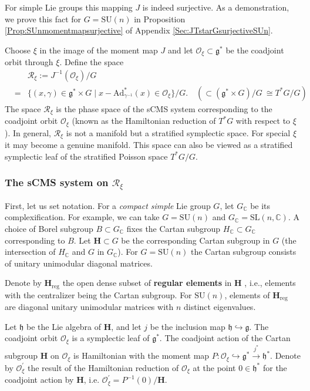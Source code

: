 \documentclass[12pt]{amsart}
\theoremstyle{definition}
\numberwithin{equation}{section}
\newcommand{\SU}{\mathrm{SU}}
\newcommand{\CC}{\mathbb{C}}
\newcommand{\gstar}{\mathfrak{g}^*}
\newcommand{\Oxi}{\mathcal{O}_{\xi}}
\newcommand{\Reducedxi}{\mathcal{R}_\xi}
\newcommand{\Adjointaction}{\mathrm{Ad}}
\newcommand{\Lieg}{\mathfrak{g}}
\newcommand{\Hreg}{\Cartan_{\mathrm{reg}}}
\newcommand{\Cartan}{\mathbf{H}}
\newcommand{\cartan}{\mathfrak{h}}
\newcommand{\Oprimexi}{\mathcal{O}^{\prime}_{\xi}}
\begin{document}
For simple Lie groups this mapping $J$ is indeed surjective. As a demonstration, we prove this fact for $G=\SU(n)$ in 
Proposition \ref{Prop:SUnmomentmapsurjective} of Appendix \ref{Sec:JTstarGsurjectiveSUn}.

Choose $\xi$ in the image of the moment map $J$ and let $\mathcal{O}_\xi\subset \gstar$ be the coadjoint orbit through $\xi$. Define the space 
\begin{eqnarray*}
		&& \Reducedxi :=	J^{-1}(\mathcal{O}_\xi)/G\\
		&=&\{(x,\gamma)\in \mathfrak{g}^*\times G \mid x-{\Adjointaction^*_{\gamma^{-1}}}(x)\in\mathcal{O}_\xi \}/G. \quad  (\subset(\mathfrak{g} ^*\times G) /G ~ \cong T^*G/G) 
\end{eqnarray*}
The space $\Reducedxi$ is the phase space of the sCMS system corresponding to the coadjoint orbit $\mathcal{O}_\xi$ 
 (known as the Hamiltonian reduction of $T^*G$ with respect to  $\xi$). In general, $\Reducedxi$ is not a manifold but a stratified symplectic space.  For special $\xi$  it  may become a genuine manifold. This space can also be viewed as a stratified symplectic leaf of the stratified Poisson space $T^*G/G$. 


\subsubsection{The sCMS system on $\Reducedxi$} 

First, let us set notation. For a \emph{compact simple} Lie group $G$, let $G_\CC$ be its complexification. For example, we can take $G=\SU(n)$ and $G_\CC=\mathrm{SL}(n,\CC)$. A choice of Borel subgroup $B\subset G_\CC$  fixes the Cartan subgroup $H_\CC\subset G_\CC$ corresponding to $B$. Let $\Cartan\subset G$ be the corresponding Cartan subgroup in $G$ (the intersection of $H_\CC$ and $G$ in $G_\CC$). For $G=\SU(n)$ the Cartan subgroup consists of unitary unimodular diagonal matrices. 

Denote by $\Hreg $ the open dense subset of \textbf{regular elements} in $\Cartan$ , i.e., elements with the centralizer being the Cartan subgroup. For $\SU(n)$, elements of $\Hreg $ are diagonal unitary unimodular matrices with $n$ distinct eigenvalues.
	
Let $\cartan$   be the Lie algebra of $\Cartan$, and let $j$ be the inclusion map $\cartan \hookrightarrow \Lieg$. The coadjoint orbit $\Oxi$ is a symplectic leaf of $\gstar$. The coadjoint action of the Cartan subgroup $\Cartan$ on $\Oxi$ is Hamiltonian with the moment map $P: \Oxi \hookrightarrow \Lieg^* \stackrel{j^*}{\rightarrow} \cartan^*$. Denote by $\Oprimexi$ the result of the Hamiltonian reduction of $\Oxi$ at the point $0 \in \cartan^*$ for the coadjoint action by $\Cartan$, i.e. $\Oprimexi = P^{-1}(0) /\Cartan$.
\end{document}
